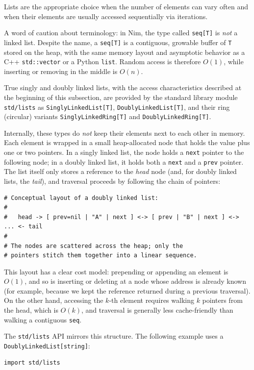 \documentclass[justified, sixbynine]{tufte-book}
\def\ft{\small\tt}
\theoremstyle{plain}%
\newtheorem * {corollary}{Corollary}
\theoremstyle{definition}
\theoremstyle{remark}
\newtheorem * {remark}{Remark}
\newtheorem * {note}{Note}
\begin{document}
\begin{fullwidth}
Lists are the appropriate choice when the number of elements can vary often and when their elements are usually accessed sequentially via iterations.

A word of caution about terminology: in Nim, the type called {\ft seq[T]} is {\it not} a linked list. Despite the name, a {\ft seq[T]} is a contiguous, growable buffer of {\ft T} stored on the heap, with the same memory layout and asymptotic behavior as a C++ {\ft std::vector} or a Python {\ft list}. Random access is therefore $O(1)$, while inserting or removing in the middle is $O(n)$.

True singly and doubly linked lists, with the access characteristics described at the beginning of this subsection, are provided by the standard library module {\ft std/lists} as {\ft SinglyLinkedList[T]}, {\ft DoublyLinkedList[T]}, and their ring (circular) variants {\ft SinglyLinkedRing[T]} and {\ft DoublyLinkedRing[T]}.

Internally, these types do {\it not} keep their elements next to each other in memory. Each element is wrapped in a small heap-allocated node that holds the value plus one or two pointers. In a singly linked list, the node holds a {\ft next} pointer to the following node; in a doubly linked list, it holds both a {\ft next} and a {\ft prev} pointer. The list itself only stores a reference to the {\it head} node (and, for doubly linked lists, the {\it tail}), and traversal proceeds by following the chain of pointers:

\begin{lstlisting}
# Conceptual layout of a doubly linked list:
#
#   head -> [ prev=nil | "A" | next ] <-> [ prev | "B" | next ] <-> ... <- tail
#
# The nodes are scattered across the heap; only the
# pointers stitch them together into a linear sequence.
\end{lstlisting}

This layout has a clear cost model: prepending or appending an element is $O(1)$, and so is inserting or deleting at a node whose address is already known (for example, because we kept the reference returned during a previous traversal). On the other hand, accessing the $k$-th element requires walking $k$ pointers from the head, which is $O(k)$, and traversal is generally less cache-friendly than walking a contiguous {\ft seq}.

The {\ft std/lists} API mirrors this structure. The following example uses a {\ft DoublyLinkedList[string]}:

\begin{lstlisting}
import std/lists


\end{lstlisting}
\end{fullwidth}
\end{document}

